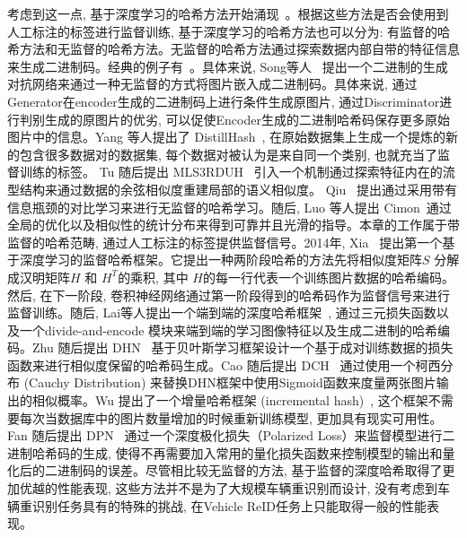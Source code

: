 考虑到这一点, 基于深度学习的哈希方法开始涌现~\cite{cao2017hashnet, fan2020deep, li2015feature, zhu2016deep, liu2016deep}。根据这些方法是否会使用到人工标注的标签进行监督训练, 基于深度学习的哈希方法也可以分为: 有监督的哈希方法和无监督的哈希方法。无监督的哈希方法通过探索数据内部自带的特征信息来生成二进制码。经典的例子有~\cite{song2018binary, yang2019distillhash, tu2020mls3rduh, qiu2021unsupervised, luo2020cimon}。具体来说, Song等人~\cite{song2018binary} 提出一个二进制的生成对抗网络来通过一种无监督的方式将图片嵌入成二进制码。具体来说, 通过Generator在encoder生成的二进制码上进行条件生成原图片, 通过Discriminator进行判别生成的原图片的优劣, 可以促使Encoder生成的二进制哈希码保存更多原始图片中的信息。Yang 等人提出了 DistillHash~\cite{yang2019distillhash}, 在原始数据集上生成一个提炼的新的包含很多数据对的数据集, 每个数据对被认为是来自同一个类别, 也就充当了监督训练的标签。 Tu 随后提出 MLS3RDUH~\cite{tu2020mls3rduh}  引入一个机制通过探索特征内在的流型结构来通过数据的余弦相似度重建局部的语义相似度。 Qiu ~\cite{qiu2021unsupervised}提出通过采用带有信息瓶颈的对比学习来进行无监督的哈希学习。随后, Luo 等人提出 Cimon~\cite{luo2020cimon}通过全局的优化以及相似性的统计分布来得到可靠并且光滑的指导。本章的工作属于带监督的哈希范畴, 通过人工标注的标签提供监督信号。2014年, Xia~\cite{xia2014supervised} 提出第一个基于深度学习的监督哈希框架。它提出一种两阶段哈希的方法先将相似度矩阵$S$ 分解成汉明矩阵$H$ 和 $H^T$的乘积, 其中 $H$的每一行代表一个训练图片数据的哈希编码。然后, 在下一阶段, 卷积神经网络通过第一阶段得到的哈希码作为监督信号来进行监督训练。随后, Lai等人提出一个端到端的深度哈希框架~\cite{lai2015simultaneous}, 通过三元损失函数以及一个divide-and-encode 模块来端到端的学习图像特征以及生成二进制的哈希编码。Zhu 随后提出 DHN~\cite{zhu2016deep} 基于贝叶斯学习框架设计一个基于成对训练数据的损失函数来进行相似度保留的哈希码生成。Cao 随后提出 DCH~\cite{cao2018deep} 通过使用一个柯西分布 (Cauchy Distribution) 来替换DHN框架中使用Sigmoid函数来度量两张图片输出的相似概率。Wu 提出了一个增量哈希框架 (incremental hash)~\cite{wu2019deep}, 这个框架不需要每次当数据库中的图片数量增加的时候重新训练模型, 更加具有现实可用性。 Fan 随后提出 DPN~\cite{fan2020deep} 通过一个深度极化损失（Polarized Loss）来监督模型进行二进制哈希码的生成, 使得不再需要加入常用的量化损失函数来控制模型的输出和量化后的二进制码的误差。尽管相比较无监督的方法, 基于监督的深度哈希取得了更加优越的性能表现, 这些方法并不是为了大规模车辆重识别而设计, 没有考虑到车辆重识别任务具有的特殊的挑战, 在Vehicle ReID任务上只能取得一般的性能表现。 \par

